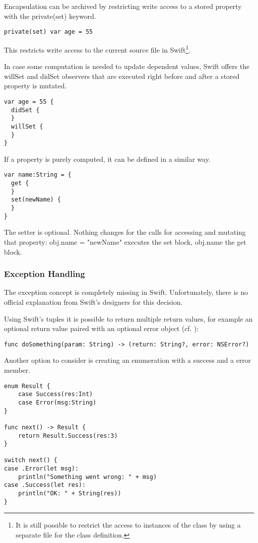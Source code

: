 Encapsulation can be archived by restricting write access to a stored property with the private(set) keyword.

\begin{lstlisting}[frame=none]
private(set) var age = 55
\end{lstlisting}

This restricts write access to the current source file in Swift\footnote{It is still possible to restrict the access to instances of the class by using a separate file for the class definition.}.

In case some computation is needed to update dependent values, Swift offers the willSet and didSet observers that are executed right before and after a stored property is mutated.

\begin{lstlisting}[frame=none]
var age = 55 {
  didSet {
  }
  willSet {
  }
}
\end{lstlisting}

If a property is purely computed, it can be defined in a similar way.

\begin{lstlisting}[frame=none]
var name:String = {
  get {
  }
  set(newName) {
  }
}
\end{lstlisting}

The setter is optional. Nothing changes for the calls for accessing and mutating that property: obj.name = "newName" executes the set block, obj.name the get block.

\subsubsection{Exception Handling}

The exception concept is completely missing in Swift. Unfortunately, there is no official explanation from Swift's designers for this decision.

Using Swift's tuples it is possible to return multiple return values, for example an optional return value paired with an optional error object (cf. \cite{swift-error-handling}):
\begin{lstlisting}[frame=none]
func doSomething(param: String) -> (return: String?, error: NSError?)
\end{lstlisting}

Another option to consider is creating an enumeration with a success and a error member.

\begin{lstlisting}[frame=none]
enum Result {
    case Success(res:Int)
    case Error(msg:String)
}

func next() -> Result {
    return Result.Success(res:3)
}

switch next() {
case .Error(let msg):
    println("Something went wrong: " + msg)
case .Success(let res):
    println("OK: " + String(res))
}\end{lstlisting}

